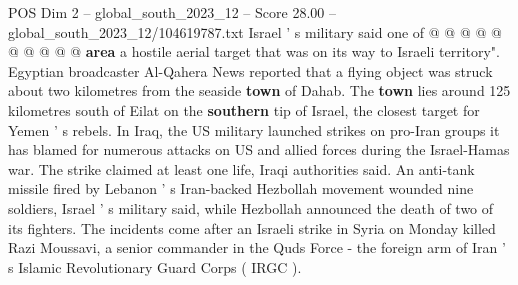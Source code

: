 \begin{textsample}{POS Dim 2 – global\_south\_2023\_12 – Score 28.00 – global\_south\_2023\_12/104619787.txt}
Israel ' s military said one of @ @ @ @ @ @ @ @ @ @ \textbf{area} a hostile aerial target that was on its way to Israeli territory".
Egyptian broadcaster Al-Qahera News reported that a flying object was struck about two kilometres from the seaside \textbf{town} of Dahab.
The \textbf{town} lies around 125 kilometres south of Eilat on the \textbf{southern} tip of Israel, the closest target for Yemen ' s rebels.
In Iraq, the US military launched strikes on pro-Iran groups it has blamed for numerous attacks on US and allied forces during the Israel-Hamas war.
The strike claimed at least one life, Iraqi authorities said.
An anti-tank missile fired by Lebanon ' s Iran-backed Hezbollah movement wounded nine soldiers, Israel ' s military said, while Hezbollah announced the death of two of its fighters.
The incidents come after an Israeli strike in Syria on Monday killed Razi Moussavi, a senior commander in the Quds Force - the foreign arm of Iran ' s Islamic Revolutionary Guard Corps ( IRGC ).

\end{textsample}

